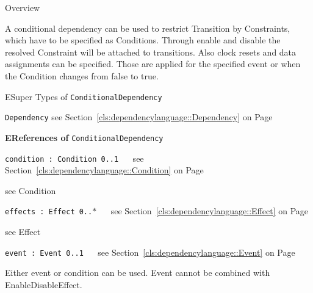 	\begin{longdescription}
		\item[Overview] 		
				

	

		A conditional dependency can be used to restrict Transition by Constraints, which have to be specified as Conditions.
Through enable and disable the resolved Constraint will be attached to transitions.
Also clock resets and data assignments can be specified.
Those are applied for the specified event or when the Condition changes from false to true.		
		\item[ESuper Types of \texttt{ConditionalDependency}] ~
			\begin{longdescription}
				\item[\texttt{Dependency}] see Section~\ref{cls:dependencylanguage::Dependency} on Page~\pageref{cls:dependencylanguage::Dependency}						\end{longdescription}
		
	
			\item[\textbf{EReferences of} \texttt{ConditionalDependency}] ~
			\begin{longdescription}
	\item[\texttt{condition : Condition \symbol{"5B}0..1\symbol{"5D}
}] ~
	see Section~\ref{cls:dependencylanguage::Condition} on Page~\pageref{cls:dependencylanguage::Condition}
	
	\nopagebreak
		
				

	

		see Condition		
	\item[\texttt{effects : Effect \symbol{"5B}0..$*$\symbol{"5D}
}] ~
	see Section~\ref{cls:dependencylanguage::Effect} on Page~\pageref{cls:dependencylanguage::Effect}
	
	\nopagebreak
		
				

	

		see Effect		
	\item[\texttt{event : Event \symbol{"5B}0..1\symbol{"5D}
}] ~
	see Section~\ref{cls:dependencylanguage::Event} on Page~\pageref{cls:dependencylanguage::Event}
	
	\nopagebreak
		
				

	

		Either event or condition can be used.
Event cannot be combined with EnableDisableEffect.		
			\end{longdescription}
	
	\end{longdescription}
	

